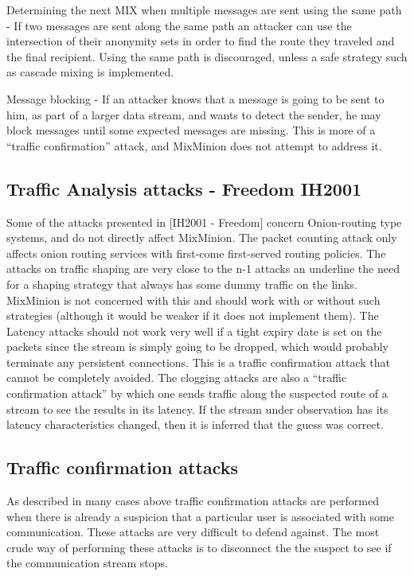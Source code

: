 \documentclass{article}
\begin{document}
Determining the next MIX when multiple messages are sent using the
same path - If two messages are sent along the same path an attacker
can use the intersection of their anonymity sets in order to find the
route they traveled and the final recipient. Using the same path is
discouraged, unless a safe strategy such as cascade mixing is
implemented. 

Message blocking - If an attacker knows that a message is going to be
sent to him, as part of a larger data stream, and wants to detect the
sender, he may block messages until some expected messages are
missing. This is more of a ``traffic confirmation'' attack, and
MixMinion does not attempt to address it.

\subsection{Traffic Analysis attacks - Freedom IH2001}

Some of the attacks presented in [IH2001 - Freedom] concern
Onion-routing type systems, and do not directly affect MixMinion. The
packet counting attack only affects onion routing services with
first-come first-served routing policies. The attacks on traffic
shaping are very close to the n-1 attacks an underline the need for a
shaping strategy that always has some dummy traffic on the
links. MixMinion is not concerned with this and should work with or
without such strategies (although it would be weaker if it does not
implement them). The Latency attacks should not work very well if a
tight expiry date is set on the packets since the stream is simply
going to be dropped, which would probably terminate any persistent
connections. This is a traffic confirmation attack that cannot be
completely avoided. The clogging attacks are also a ``traffic
confirmation attack'' by which one sends traffic along the suspected
route of a stream to see the results in its latency. If the stream
under observation has its latency characteristics changed, then it is
inferred that the guess was correct.

\subsection{Traffic confirmation attacks}

As described in many cases above traffic confirmation attacks are
performed when there is already a suspicion that a particular user is
associated with some communication. These attacks are very difficult
to defend against. The most crude way of performing these attacks is
to disconnect the the suspect to see if the communication stream stops.
\end{document}
